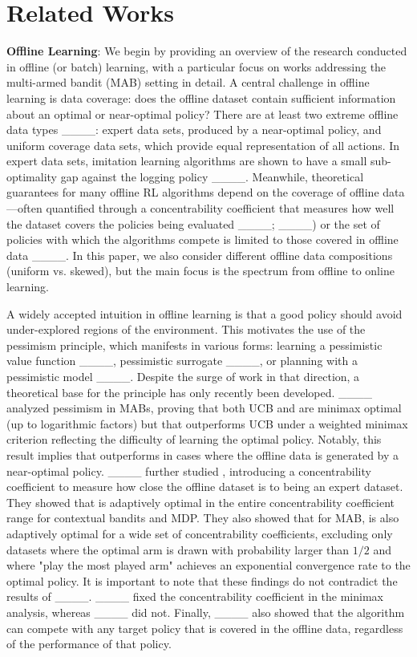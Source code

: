 \section{Related Works}
\textbf{Offline Learning}: We begin by providing an overview of the research conducted in offline (or batch) learning, with a particular focus on works addressing the multi-armed bandit (MAB) setting in detail. A central challenge in offline learning is data coverage: does the offline dataset contain sufficient information about an optimal or near-optimal policy? There are at least two extreme offline data types ____: expert data sets, produced by a near-optimal policy, and uniform coverage data sets, which provide equal representation of all actions. In expert data sets, imitation learning algorithms are shown to have a small sub-optimality gap against the logging policy ____. Meanwhile, theoretical guarantees for many offline RL algorithms depend on the coverage of offline data—often quantified through a concentrability coefficient that measures how well the dataset covers the policies being evaluated ____; ____) or the set of policies with which the algorithms compete is limited to those covered in offline data ____. In this paper, we also consider different offline data compositions (uniform vs. skewed), but the main focus is the spectrum from offline to online learning.



A widely accepted intuition in offline learning is that a good policy should avoid under-explored regions of the environment. This motivates the use of the pessimism principle, which manifests in various forms: learning a pessimistic value function ____, pessimistic surrogate ____, or planning with a pessimistic model ____. 
Despite the surge of work in that direction, a theoretical base for the principle has only recently been developed. 
____ analyzed pessimism in MABs, proving that both UCB and \alglcb are minimax optimal (up to logarithmic factors) but that \alglcb outperforms UCB under a weighted minimax criterion reflecting the difficulty of learning the optimal policy.  Notably, this result implies that \alglcb outperforms \algucb in cases where the offline data is generated by a near-optimal policy. ____ further studied \alglcb, introducing a concentrability coefficient to measure how close the offline dataset is to being an expert dataset. They showed that \alglcb is adaptively optimal in the entire concentrability coefficient range for contextual bandits and MDP. They also showed that for MAB, \alglcb is also adaptively optimal for a wide set of concentrability coefficients, excluding only datasets where the optimal arm is drawn with probability larger than $1/2$ and where "play the most played arm" achieves an exponential convergence rate to the optimal policy.
It is important to note that these findings do not contradict the results of ____.  ____ fixed the concentrability coefficient in the minimax analysis, whereas ____ did not. Finally, ____ also showed that the \alglcb algorithm can compete with any target policy that is covered in the offline data, regardless of the performance of that policy.

